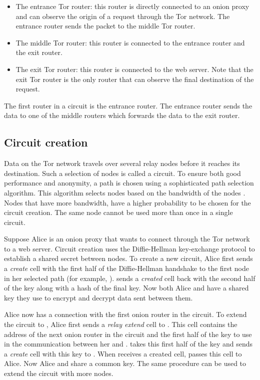 \documentclass[12pt,journal,compsoc]{IEEEtran}
\begin{document}
		\begin{itemize}
			\item{The entrance Tor router:} this router is directly connected to an onion proxy and can observe the origin of a request through the Tor network. The entrance router sends the packet to the middle Tor router.
			\item{The middle Tor router:} this router is connected to the entrance router and the exit router.
			\item{The exit Tor router:} this router is connected to the web server. Note that the exit Tor router is the only router that can observe the final destination of the request.
		\end{itemize}
		
		The first router in a circuit is the entrance router. The entrance router sends the data to one of the middle routers which forwards the data to the exit router.
			
	\subsection{Circuit creation}
		\label{ss:tor_circuit}
		
		Data on the Tor network travels over several relay nodes before it reaches its destination. Such a selection of nodes is called a circuit. To ensure both good performance and anonymity, a path is chosen using a sophisticated path selection algorithm. This algorithm selects nodes based on the bandwidth of the nodes \cite{wang2012congestion}. Nodes that have more bandwidth, have a higher probability to be chosen for the circuit creation. The same node cannot be used more than once in a single circuit.
		
		Suppose Alice is an onion proxy that wants to connect through the Tor network to a web server. Circuit creation uses the Diffie-Hellman key-exchange protocol \cite{diffiehellman} to establish a shared secret between nodes. To create a new circuit, Alice first sends a \emph{create} cell with the first half of the Diffie-Hellman handshake to the first node in her selected path (for example, ).  sends a \emph{created} cell back with the second half of the key along with a hash of the final key. Now both Alice and  have a shared key they use to encrypt and decrypt data sent between them.
		
		Alice now has a connection with the first onion router in the circuit. To extend the circuit to , Alice first sends a \emph{relay extend} cell to . This cell contains the address of the next onion router in the circuit and the first half of the key to use in the communication between her and .  takes this first half of the key and sends a \emph{create} cell with this key to . When  receives a created cell,  passes this cell to Alice. Now Alice and  share a common key. The same procedure can be used to extend the circuit with more nodes.
			
\end{document}

